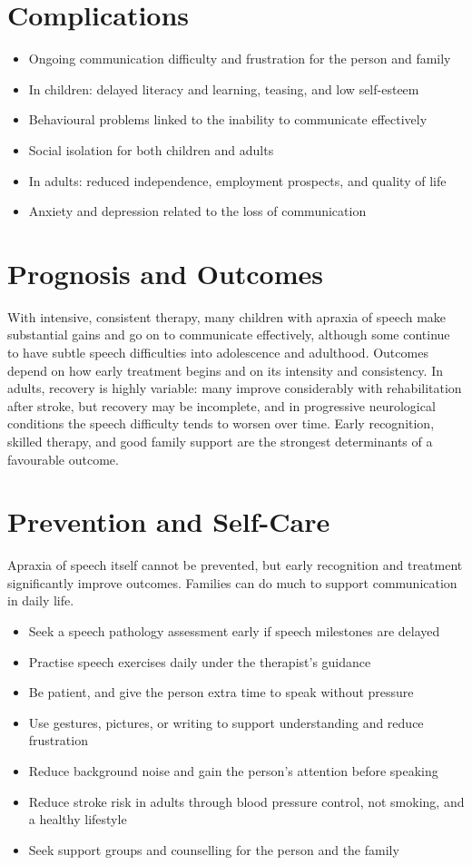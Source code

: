\section*{Complications}
\begin{itemize}
    \item Ongoing communication difficulty and frustration for the person and family
    \item In children: delayed literacy and learning, teasing, and low self-esteem
    \item Behavioural problems linked to the inability to communicate effectively
    \item Social isolation for both children and adults
    \item In adults: reduced independence, employment prospects, and quality of life
    \item Anxiety and depression related to the loss of communication
\end{itemize}

\section*{Prognosis and Outcomes}
With intensive, consistent therapy, many children with apraxia of speech make substantial gains and go on to communicate effectively, although some continue to have subtle speech difficulties into adolescence and adulthood. Outcomes depend on how early treatment begins and on its intensity and consistency. In adults, recovery is highly variable: many improve considerably with rehabilitation after stroke, but recovery may be incomplete, and in progressive neurological conditions the speech difficulty tends to worsen over time. Early recognition, skilled therapy, and good family support are the strongest determinants of a favourable outcome.

\section*{Prevention and Self-Care}
Apraxia of speech itself cannot be prevented, but early recognition and treatment significantly improve outcomes. Families can do much to support communication in daily life.

\begin{itemize}
    \item Seek a speech pathology assessment early if speech milestones are delayed
    \item Practise speech exercises daily under the therapist's guidance
    \item Be patient, and give the person extra time to speak without pressure
    \item Use gestures, pictures, or writing to support understanding and reduce frustration
    \item Reduce background noise and gain the person's attention before speaking
    \item Reduce stroke risk in adults through blood pressure control, not smoking, and a healthy lifestyle
    \item Seek support groups and counselling for the person and the family
\end{itemize}

